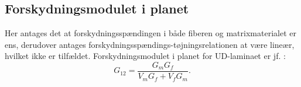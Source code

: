 \subsection{Forskydningsmodulet i planet}
Her antages det at forskydningsspændingen i både fiberen og matrixmaterialet er ens, derudover antages forskydningsspændings-tøjningsrelationen at være lineær, hvilket ikke er tilfældet.
Forskydningsmodulet i planet for UD-laminaet er jf. :
\begin{equation*}
  G_{12} = \frac{G_m G_f}{V_m G_f + V_f G_m}
.\end{equation*}

